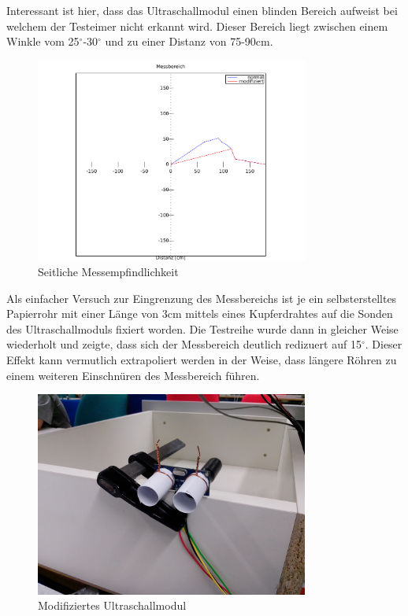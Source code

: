 Interessant ist hier, dass das Ultraschallmodul einen blinden Bereich aufweist
bei welchem der Testeimer nicht erkannt wird. Dieser Bereich liegt zwischen 
einem Winkle vom 25$^\circ$-30$^\circ$ und zu einer Distanz von 75-90cm.

\begin{figure}[h!]
	\centering
	\includegraphics[width=0.8\textwidth]{../../fig/hc-sr04_range.pdf}
	\caption{Seitliche Messempfindlichkeit}
\end{figure}

Als einfacher Versuch zur Eingrenzung des Messbereichs ist je ein 
selbsterstelltes Papierrohr mit einer Länge von 3cm mittels eines 
Kupferdrahtes auf die Sonden des Ultraschallmoduls fixiert worden. 
Die Testreihe wurde dann in gleicher Weise wiederholt und zeigte, dass
sich der Messbereich deutlich redizuert auf 15$^\circ$. Dieser Effekt 
kann vermutlich extrapoliert werden in der Weise, dass längere Röhren
zu einem weiteren Einschnüren des Messbereich führen.

\begin{figure}[h!]
	\centering
	\includegraphics[width=0.8\textwidth]{../../fig/HC-SR04_08.jpg}
	\caption{Modifiziertes Ultraschallmodul}
\end{figure}
